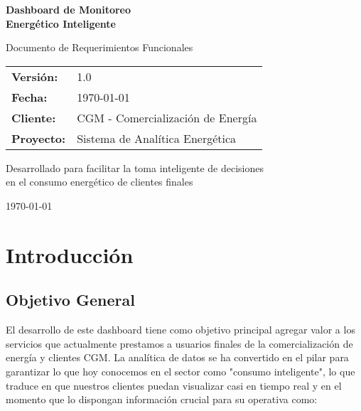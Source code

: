 \documentclass[12pt,a4paper]{article}
\begin{document}
\begin{titlepage}
\centering
\vspace*{2cm}

{\Huge\bfseries Dashboard de Monitoreo\\[0.5cm] Energético Inteligente}

\vspace{1cm}

{\Large Documento de Requerimientos Funcionales}

\vspace{2cm}

\begin{tabular}{ll}
\textbf{Versión:} & 1.0 \\
\textbf{Fecha:} & \today \\
\textbf{Cliente:} & CGM - Comercialización de Energía \\
\textbf{Proyecto:} & Sistema de Analítica Energética \\
\end{tabular}

\vspace{3cm}

{\large Desarrollado para facilitar la toma inteligente de decisiones\\en el consumo energético de clientes finales}

\vfill

{\large \today}

\end{titlepage}

\tableofcontents
\newpage

\section{Introducción}

\subsection{Objetivo General}

El desarrollo de este dashboard tiene como objetivo principal agregar valor a los servicios que actualmente prestamos a usuarios finales de la comercialización de energía y clientes CGM. La analítica de datos se ha convertido en el pilar para garantizar lo que hoy conocemos en el sector como "consumo inteligente", lo que traduce en que nuestros clientes puedan visualizar casi en tiempo real y en el momento que lo dispongan información crucial para su operativa como:
\end{document}
